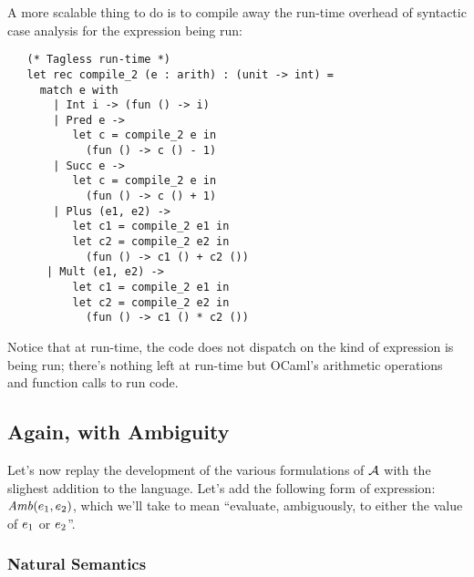 A more scalable thing to do is to compile away the run-time overhead
of syntactic case analysis for the expression being run:
\begin{verbatim}
   (* Tagless run-time *)
   let rec compile_2 (e : arith) : (unit -> int) =
     match e with
       | Int i -> (fun () -> i)
       | Pred e -> 
          let c = compile_2 e in
            (fun () -> c () - 1)
       | Succ e -> 
          let c = compile_2 e in
            (fun () -> c () + 1)
       | Plus (e1, e2) ->
          let c1 = compile_2 e1 in
          let c2 = compile_2 e2 in
            (fun () -> c1 () + c2 ())
      | Mult (e1, e2) ->
          let c1 = compile_2 e1 in
          let c2 = compile_2 e2 in
            (fun () -> c1 () * c2 ())
\end{verbatim}

Notice that at run-time, the code does not dispatch on the kind of
expression is being run; there's nothing left at run-time but OCaml's
arithmetic operations and function calls to run code.



\subsection{Again, with Ambiguity}

Let's now replay the development of the various formulations of
$\mathcal{A}$ with the slighest addition to the language.  Let's add the
following form of expression: $\mathit{Amb}(e_1,e_2)$, which we'll
take to mean ``evaluate, ambiguously, to either the value of $e_1$
or $e_2$''.

\subsubsection{Natural Semantics}

